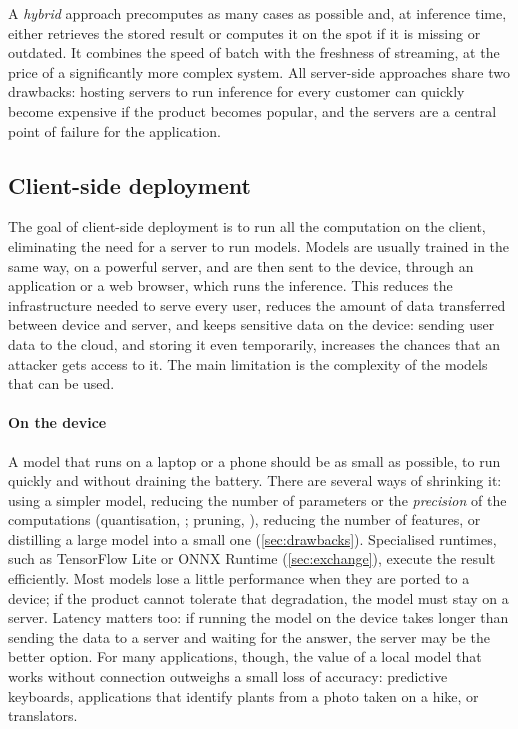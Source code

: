 A \emph{hybrid} approach precomputes as many cases as possible and, at inference time, either retrieves
the stored result or computes it on the spot if it is missing or outdated. It combines the speed of
batch with the freshness of streaming, at the price of a significantly more complex system. All
server-side approaches share two drawbacks: hosting servers to run inference for every customer can
quickly become expensive if the product becomes popular, and the servers are a central point of
failure for the application.

\subsection{Client-side deployment\extsec}

The goal of client-side deployment is to run all the computation on the client, eliminating the need
for a server to run models. Models are usually trained in the same way, on a powerful server, and are
then sent to the device, through an application or a web browser, which runs the inference. This
reduces the infrastructure needed to serve every user, reduces the amount of data transferred between
device and server, and keeps sensitive data on the device: sending user data to the cloud, and storing
it even temporarily, increases the chances that an attacker gets access to it. The main limitation is
the complexity of the models that can be used.

\paragraph{On the device} A model that runs on a laptop or a phone should be as small as possible, to
run quickly and without draining the battery. There are several ways of shrinking it: using a simpler
model, reducing the number of parameters or the \emph{precision} of the computations (quantisation,
\citealp{jacob2018quantization}; pruning, \citealp{han2016deep}), reducing the number of features, or
distilling a large model into a small one (\cref{sec:drawbacks}). Specialised runtimes, such as
TensorFlow Lite or ONNX Runtime (\cref{sec:exchange}), execute the result efficiently. Most models
lose a little performance when they are ported to a device; if the product cannot tolerate that
degradation, the model must stay on a server. Latency matters too: if running the model on the device
takes longer than sending the data to a server and waiting for the answer, the server may be the better
option. For many applications, though, the value of a local model that works without connection
outweighs a small loss of accuracy: predictive keyboards, applications that identify plants from a
photo taken on a hike, or translators.

